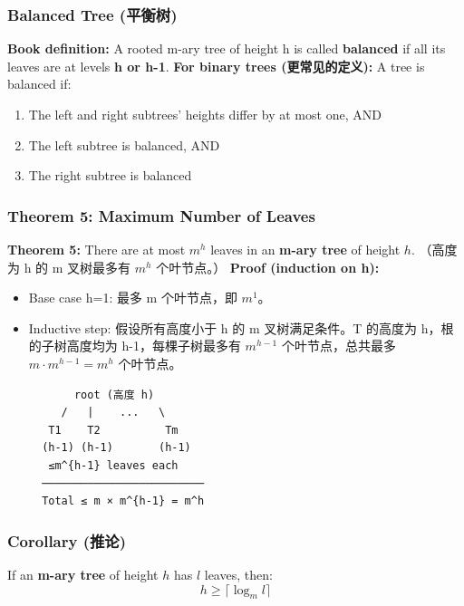 \documentclass[10pt,a4paper,openany]{ctexbook}
\theoremstyle{definition}
\theoremstyle{remark}
\begin{document}
\subsubsection{Balanced Tree (平衡树)}

\textbf{Book definition:} A rooted m-ary tree of height h is called \textbf{balanced} if all its leaves are at levels \textbf{h or h-1}.
\textbf{For binary trees (更常见的定义):} A tree is balanced if:
\begin{enumerate}
\item The left and right subtrees' heights differ by at most one, AND
\item The left subtree is balanced, AND
\item The right subtree is balanced

\end{enumerate}

\vspace{-2pt}

\subsubsection{Theorem 5: Maximum Number of Leaves}

\textbf{Theorem 5:} There are at most $m^h$ leaves in an \textbf{m-ary tree} of height $h$.
（高度为 h 的 m 叉树最多有 $m^h$ 个叶节点。）
\textbf{Proof (induction on h):}
\begin{itemize}
\item Base case h=1: 最多 m 个叶节点，即 $m^1$。
\item Inductive step: 假设所有高度小于 h 的 m 叉树满足条件。T 的高度为 h，根的子树高度均为 h-1，每棵子树最多有 $m^{h-1}$ 个叶节点，总共最多 $m \cdot m^{h-1} = m^h$ 个叶节点。

{\footnotesize\begin{verbatim}
       root (高度 h)
     /   |    ...   \
   T1    T2          Tm
  (h-1) (h-1)       (h-1)
   ≤m^{h-1} leaves each
  ─────────────────────────
  Total ≤ m × m^{h-1} = m^h
\end{verbatim}}


\end{itemize}

\subsubsection{Corollary (推论)}

If an \textbf{m-ary tree} of height $h$ has $l$ leaves, then:
\[
h \geq \lceil \log_m l \rceil
\]
\end{document}
